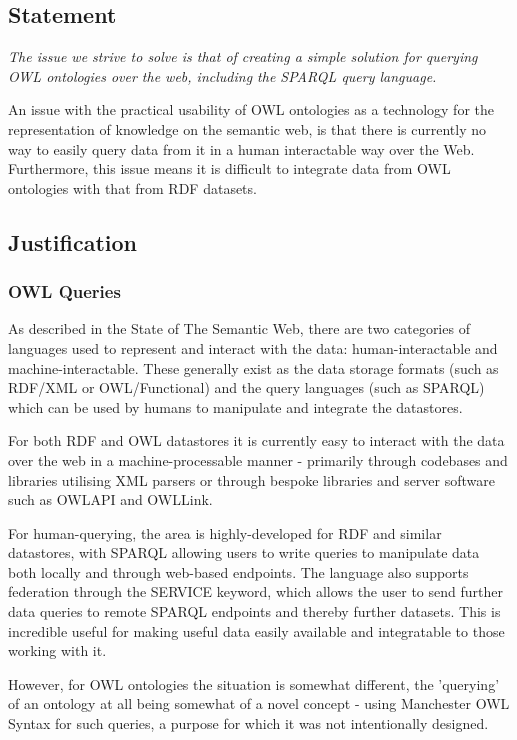 \documentclass{article}
\begin{document}
\subsection{Statement}

\emph{The issue we strive to solve is that of creating a simple solution for querying
OWL ontologies over the web, including the SPARQL query language.}

An issue with the practical usability of OWL ontologies as a technology for the
representation of knowledge on the semantic web, is that there is currently no
way to easily query data from it in a human interactable way over the Web.
Furthermore, this issue means it is difficult to integrate data from OWL
ontologies with that from RDF datasets. 

\subsection{Justification}

\subsubsection{OWL Queries}

As described in the State of The Semantic Web, there are two categories of
languages used to represent and interact with the data: human-interactable and
machine-interactable. These generally exist as the data storage formats (such as
RDF/XML or OWL/Functional) and the query languages (such as SPARQL) which can be 
used by humans to manipulate and integrate the datastores.

For both RDF and OWL datastores it is currently easy to interact with the data
over the web in a machine-processable manner - primarily through codebases and
libraries utilising XML parsers or through bespoke libraries and server software 
such as OWLAPI and OWLLink.

For human-querying, the area is highly-developed for RDF and similar datastores, 
with SPARQL allowing users to write queries to manipulate data both locally and
through web-based endpoints. The language also supports federation through the
SERVICE keyword, which allows the user to send further data queries to remote
SPARQL endpoints and thereby further datasets. This is incredible useful for
making useful data easily available and integratable to those working with it.

However, for OWL ontologies the situation is somewhat different, the 'querying'
of an ontology at all being somewhat of a novel concept - using Manchester OWL
Syntax for such queries, a purpose for which it was not intentionally designed.
\end{document}
